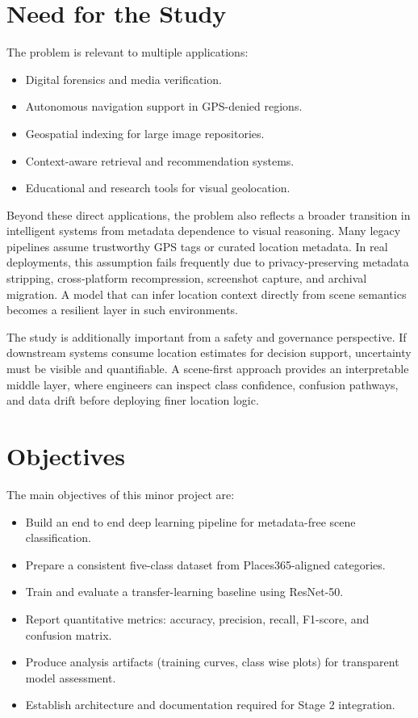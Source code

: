 \section{Need for the Study}
The problem is relevant to multiple applications:
\begin{itemize}
\item Digital forensics and media verification.
\item Autonomous navigation support in GPS-denied regions.
\item Geospatial indexing for large image repositories.
\item Context-aware retrieval and recommendation systems.
\item Educational and research tools for visual geolocation.
\end{itemize}

Beyond these direct applications, the problem also reflects a broader transition in intelligent systems from metadata dependence to visual reasoning. Many legacy pipelines assume trustworthy GPS tags or curated location metadata. In real deployments, this assumption fails frequently due to privacy-preserving metadata stripping, cross-platform recompression, screenshot capture, and archival migration. A model that can infer location context directly from scene semantics becomes a resilient layer in such environments.

The study is additionally important from a safety and governance perspective. If downstream systems consume location estimates for decision support, uncertainty must be visible and quantifiable. A scene-first approach provides an interpretable middle layer, where engineers can inspect class confidence, confusion pathways, and data drift before deploying finer location logic.

\section{Objectives}
The main objectives of this minor project are:
\begin{itemize}
\item Build an end to end deep learning pipeline for metadata-free scene classification.
\item Prepare a consistent five-class dataset from Places365-aligned categories.
\item Train and evaluate a transfer-learning baseline using ResNet-50.
\item Report quantitative metrics: accuracy, precision, recall, F1-score, and confusion matrix.
\item Produce analysis artifacts (training curves, class wise plots) for transparent model assessment.
\item Establish architecture and documentation required for Stage 2 integration.
\end{itemize}

